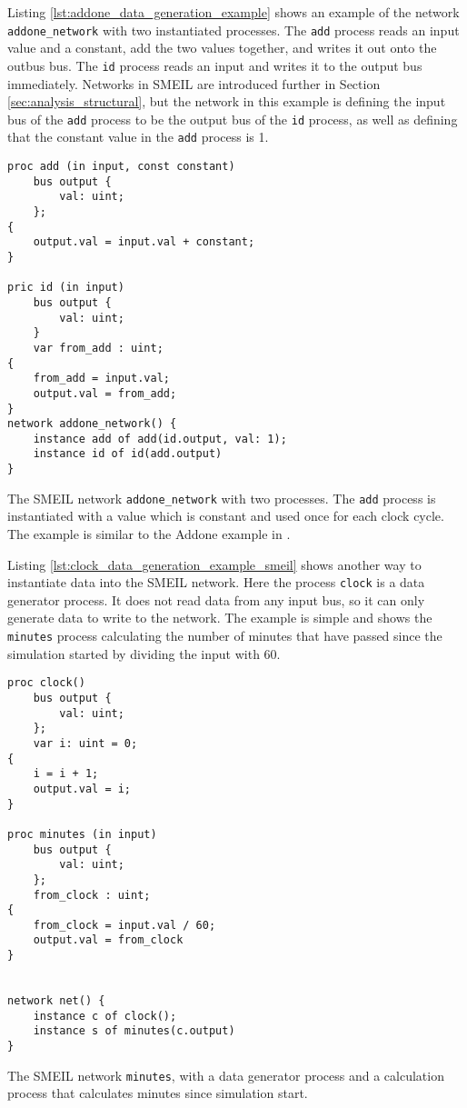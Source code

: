 Listing \ref{lst:addone_data_generation_example} shows an example of the network \texttt{addone\_network} with two instantiated processes. The \texttt{add} process reads an input value and a constant, add the two values together, and writes it out onto the outbus bus. The \texttt{id} process reads an input and writes it to the output bus immediately. Networks in SMEIL are introduced further in Section \ref{sec:analysis_structural}, but the network in this example is defining the input bus of the \texttt{add} process to be the output bus of the \texttt{id} process, as well as defining that the constant value in the \texttt{add} process is 1.
\begin{listing}
\begin{verbatim}
proc add (in input, const constant)
    bus output {
        val: uint;
    };
{
    output.val = input.val + constant;
}

pric id (in input)
    bus output {
        val: uint;
    }
    var from_add : uint;
{
    from_add = input.val;
    output.val = from_add;
}
network addone_network() {
    instance add of add(id.output, val: 1);
    instance id of id(add.output)
}
\end{verbatim}
\caption{The SMEIL network \texttt{addone\_network} with two processes. The \texttt{add} process is instantiated with a value which is constant and used once for each clock cycle. The example is similar to the Addone example in \cite{smeil}.}
\label{lst:addone_data_generation_example}
\end{listing}
Listing \ref{lst:clock_data_generation_example_smeil} shows another way to instantiate data into the SMEIL network. Here the process \texttt{clock} is a data generator process. It does not read data from any input bus, so it can only generate data to write to the network. The example is simple and shows the \texttt{minutes} process calculating the number of minutes that have passed since the simulation started by dividing the input with 60.\\

\begin{listing}
\begin{verbatim}
proc clock()
    bus output {
        val: uint;
    };
    var i: uint = 0;
{
    i = i + 1;
    output.val = i;
}

proc minutes (in input)
    bus output {
        val: uint;
    };
    from_clock : uint;
{
    from_clock = input.val / 60;
    output.val = from_clock
}


network net() {
    instance c of clock();
    instance s of minutes(c.output)
}
\end{verbatim}
\caption{The SMEIL network \texttt{minutes}, with a data generator process and a calculation process that calculates minutes since simulation start.}
\label{lst:clock_data_generation_example_smeil}
\end{listing}

